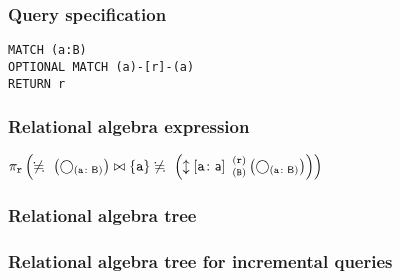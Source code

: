 \subsubsection*{Query specification}

\begin{lstlisting}
MATCH (a:B)
OPTIONAL MATCH (a)-[r]-(a)
RETURN r
\end{lstlisting}

\subsubsection*{Relational algebra expression}

$\projection{\var{r}} \left(\alldifferent{} \left(\getvertices{a}{B}\right) \join \{\var{a}\} \alldifferent{} \left(\expandboth{a}{a}{B}{r}{} \left(\getvertices{a}{B}\right)\right)\right)$

\subsubsection*{Relational algebra tree}


\subsubsection*{Relational algebra tree for incremental queries}


